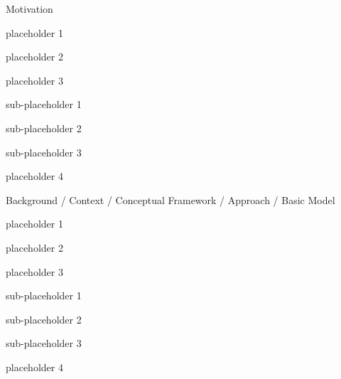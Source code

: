 \begin{frame}
\maketitle
\end{frame}
\begin{frame}{Motivation}
  \begin{wideitemize}
    \item placeholder 1
    \item placeholder 2
    \item placeholder 3
      
      \begin{wideitemize}
    		\item sub-placeholder 1
    		\item sub-placeholder 2
    		\item sub-placeholder 3
  	  \end{wideitemize}
  	
  	\item placeholder 4
  \end{wideitemize}
\end{frame}
\begin{frame}{Background / Context / Conceptual Framework / Approach / Basic Model}
  \begin{wideitemize}
    \item placeholder 1
    \item placeholder 2
    \item placeholder 3
      
      \begin{wideitemize}
    		\item sub-placeholder 1
    		\item sub-placeholder 2
    		\item sub-placeholder 3
  	  \end{wideitemize}
  	
  	\item placeholder 4
  \end{wideitemize}
\end{frame}
